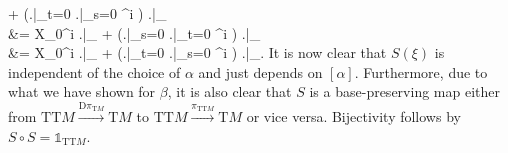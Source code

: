 \documentclass[a4paper,oneside,11pt,bibliography=totoc]{scrartcl}
\theoremstyle{plain}
\theoremstyle{remark}
\theoremstyle{definition}
\begin{document}
	+ \mleft(\mleft.\mright|_{t=0} \mleft.\mright|_{s=0} \beta^i \mright) \mleft.\mright|_{\omega}
\nonumber
\\
&=
X_0^i \mleft.\mright|_{\omega}
	+ \mleft(\mleft.\mright|_{s=0} \mleft.\mright|_{t=0} \alpha^i \mright) \mleft.\mright|_{\omega}
\nonumber
\\
&=
X_0^i \mleft.\mright|_{\omega}
	+ \mleft(\mleft.\mright|_{t=0} \mleft.\mright|_{s=0} \alpha^i \mright) \mleft.\mright|_{\omega}.
\ea
It is now clear that $S(\xi)$ is independent of the choice of $\alpha$ and just depends on $[\alpha]$. Furthermore, due to what we have shown for $\beta$, it is also clear that $S$ is a base-preserving map either from $\mathrm{TT}M \stackrel{\mathrm{D}\pi_{\mathrm{T}M}}{\to} \mathrm{T}M$ to $\mathrm{TT}M \stackrel{\pi_{\mathrm{TT}M}}{\to} \mathrm{T}M$ or vice versa. 
Bijectivity follows by $S\circ S = \mathds{1}_{\mathrm{TT}M}$.
\end{document}

